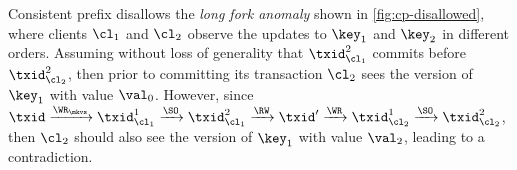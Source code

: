 Consistent prefix disallows the \emph{long fork anomaly} shown in \cref{fig:cp-disallowed}, where clients \(\cl_1\) and \(\cl_2\) observe the updates to \(\key_1\) and \(\key_2\) 
in different orders. 
Assuming without loss of generality that \( \txid_{\cl_1}^{2} \) commits 
before \( \txid_{\cl_2}^{2} \), then prior to committing its transaction \(\cl_2\) sees 
the version of \(\key_1\) with value \(\val_0\). 
However, since \(\txid \xrightarrow{\WR_{\mkvs}} \txid_{\cl_{1}}^{1} 
\xrightarrow{\SO} \txid_{\cl_{1}}^{2} \xrightarrow{\RW} \txid' \xrightarrow{\WR} \txid_{\cl_{2}}^{1} \xrightarrow{\SO} 
\txid_{\cl_2}^{2}\), then \(\cl_2\) should also see the version of \(\key_1\) with 
value \(\val_2\), leading to a contradiction.


